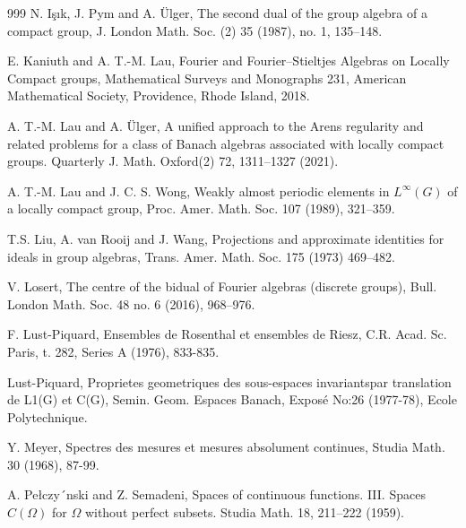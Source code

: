 \documentclass[12pt, twoside, leqno]{article}
\theoremstyle{definition}
\theoremstyle{definition}
\numberwithin{equation}{section}
\begin{document}
\begin{thebibliography}{999}
  N. Işık, J. Pym and A. Ülger, The second dual of the group algebra of a compact group, J. London Math. Soc. (2) 35 (1987), no. 1, 135–148.

  E. Kaniuth and A. T.-M. Lau, Fourier and Fourier–Stieltjes Algebras on Locally Compact groups, Mathematical Surveys and Monographs 231, American Mathematical Society, Providence, Rhode Island, 2018.\vspace{2mm}

  A. T.-M. Lau and A. Ülger, A unified approach to the Arens regularity and related problems for a class of Banach algebras associated with locally compact groups. Quarterly J. Math. Oxford(2) 72, 1311–1327 (2021).\vspace{2mm}

  A. T.-M. Lau and J. C. S. Wong, Weakly almost periodic elements in $ L^{\infty}(G) $ of a locally compact group, Proc. Amer. Math. Soc. 107 (1989), 321–359.\vspace{2mm}

  T.S. Liu, A. van Rooij and J. Wang, Projections and approximate identities for ideals in group algebras, Trans. Amer. Math. Soc. 175 (1973) 469–482. \vspace{2mm}

 V. Losert, The centre of the bidual of Fourier algebras (discrete groups), Bull. London Math. Soc. 48 no. 6 (2016), 968–976.\vspace{2mm}

 F. Lust-Piquard, Ensembles de Rosenthal et ensembles de Riesz, C.R. Acad. Sc. Paris, t. 282, Series A (1976), 833-835.\vspace{2mm}

 Lust-Piquard, Proprietes geometriques des sous-espaces invariantspar translation de L1(G) et C(G), Semin. Geom. Espaces Banach, Exposé No:26 (1977-78), Ecole Polytechnique.\vspace{2mm}

 Y. Meyer, Spectres des mesures et mesures absolument continues, Studia Math. 30 (1968), 87-99.\vspace{2mm}

 A. Pełczy´nski and Z. Semadeni, Spaces of continuous functions. III. Spaces  $ C(\Omega) $ for $ \Omega $ without perfect subsets. Studia Math. 18, 211–222 (1959).\vspace{2mm}


\end{thebibliography}
\end{document}

